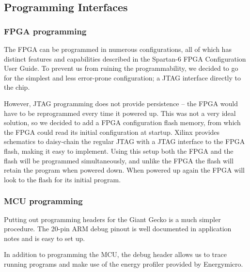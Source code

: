 \subsection{Programming Interfaces}

\subsubsection{FPGA programming}
The FPGA can be programmed in numerous configurations, all of which has distinct
features and capabilities described in the Spartan-6 FPGA Configuration User
Guide. To prevent us from ruining the programmability, we decided to go for the
simplest and less error-prone configuration; a JTAG interface directly to the
chip.

However, JTAG programming does not provide persistence -- the FPGA would
have to be reprogrammed every time it powered up. This was not a very ideal
solution, so we decided to add a FPGA configuration flash memory, from which
the FPGA could read its initial configuration at startup. Xilinx provides
schematics to daisy-chain the regular JTAG with a
JTAG interface to the FPGA flash, making it easy to implement. Using this
setup both the FPGA and the flash will be programmed simultaneously, and 
unlike the FPGA the flash will retain the program when powered down. When
powered up again the FPGA will look to the flash for its initial program.

\subsubsection{MCU programming}
Putting out programming headers for the Giant Gecko is a much simpler procedure.
The 20-pin ARM debug pinout is well documented in application notes and is easy
to set up.

In addition to programming the MCU, the debug header allows us to trace running
programs  and make use of the energy profiler provided by 
Energymicro.